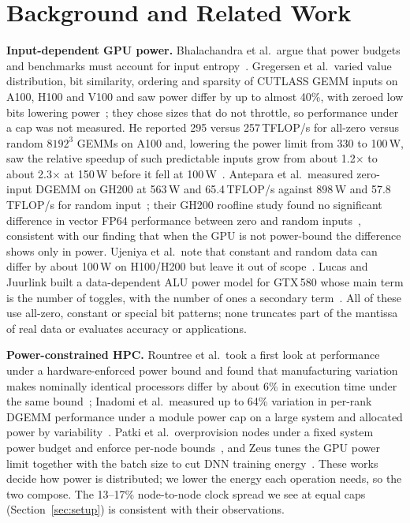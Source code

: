 \documentclass[conference]{IEEEtran}
\newcommand{\W}{\,W}
\newcommand{\pct}{\%}
\begin{document}
\section{Background and Related Work}\label{sec:related}

\textbf{Input-dependent GPU power.} Bhalachandra et al.\ argue that power budgets and benchmarks must account for
input entropy~\cite{Bhalachandra2022}. Gregersen et al.\ varied value distribution, bit similarity, ordering and
sparsity of CUTLASS GEMM inputs on A100, H100 and V100 and saw power differ by up to almost 40\pct, with zeroed
low bits lowering power~\cite{Gregersen2024}; they chose sizes that do not throttle, so performance under a cap
was not measured. He reported 295 versus 257\,TFLOP/s for all-zero versus random $8192^3$ GEMMs on A100 and, lowering
the power limit from 330 to 100\W, saw the relative speedup of such predictable inputs grow from about 1.2$\times$ to
about 2.3$\times$ at 150\W{} before it fell at 100\W~\cite{He2024}. Antepara et al.\ measured zero-input DGEMM on
GH200 at 563\W{} and 65.4\,TFLOP/s against 898\W{} and 57.8\,TFLOP/s for random input~\cite{Antepara2025}; their
GH200 roofline study found no significant difference in vector FP64 performance between zero and random
inputs~\cite{Antepara2025W}, consistent with our finding that when the GPU is not power-bound the difference shows
only in power. Ujeniya et al.\ note that constant and random data can differ
by about 100\W{} on H100/H200 but leave it out of scope~\cite{Ujeniya2026}. Lucas and Juurlink built a
data-dependent ALU power model for GTX\,580 whose main term is the number of toggles, with the number of ones a
secondary term~\cite{Lucas2016}. All of these use all-zero, constant or special bit patterns; none truncates part
of the mantissa of real data or evaluates accuracy or applications.

\textbf{Power-constrained HPC.} Rountree et al.\ took a first look at performance under a hardware-enforced power
bound and found that manufacturing variation makes nominally identical processors differ by about 6\pct{} in
execution time under the same bound~\cite{Rountree2012}; Inadomi et al.\ measured up to 64\pct{} variation in per-rank DGEMM
performance under a module power cap on a large system and allocated power by variability~\cite{Inadomi2015}.
Patki et al.\ overprovision nodes under a fixed system power budget and enforce per-node bounds~\cite{Patki2013},
and Zeus tunes the GPU power limit together with the batch size to cut DNN training energy~\cite{Zeus2023}. These
works decide how power is distributed; we lower the energy each operation needs, so the two compose. The 13--17\pct{}
node-to-node clock spread we see at equal caps (Section~\ref{sec:setup}) is consistent with their observations.
\end{document}
